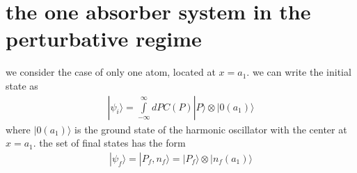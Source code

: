 \section{the one absorber system in the perturbative regime}\label{section-perturbative-one-particle}

we consider the case of only one atom, located at $x=a_1$. we can write the initial state as
\begin{align}
  |\psi_i\rangle = \int\limits_{-\infty}^{\infty}dP C(P)|P\rangle\otimes|0(a_1)\rangle
\end{align}
where $|0(a_1)\rangle$ is the ground state of the harmonic oscillator with the center at $x=a_1$.
the set of final states has the form
\begin{align}
  |\psi_f\rangle = |P_f,n_f\rangle = |P_f\rangle\otimes|n_f(a_1)\rangle
\end{align}

